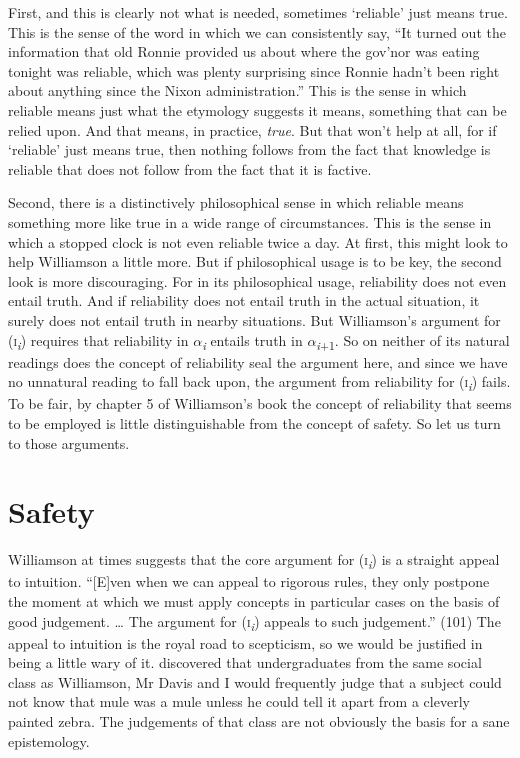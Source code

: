 First, and this is clearly not what is needed, sometimes `reliable' just means true. This is the sense of the word in which we can consistently say, ``It turned out the information that old Ronnie provided us about where the gov'nor was eating tonight was reliable, which was plenty surprising since Ronnie hadn't been right about anything since the Nixon administration.'' This is the sense in which reliable means just what the etymology suggests it means, something that can be relied upon. And that means, in practice, \textit{true}. But that won't help at all, for if `reliable' just means true, then nothing follows from the fact that knowledge is reliable that does not follow from the fact that it is factive.

Second, there is a distinctively philosophical sense in which reliable means something more like true in a wide range of circumstances. This is the sense in which a stopped clock is not even reliable twice a day. At first, this might look to help Williamson a little more. But if philosophical usage is to be key, the second look is more discouraging. For in its philosophical usage, reliability does not even entail truth. And if reliability does not entail truth in the actual situation, it surely does not entail truth in nearby situations. But Williamson's argument for (\textsc{i}\textit{\textsubscript{i}}) requires that reliability in ${\alpha}$\textit{\textsubscript{i}} entails truth in ${\alpha}$\textit{\textsubscript{i}}\textsubscript{+1}. So on neither of its natural readings does the concept of reliability seal the argument here, and since we have no unnatural reading to fall back upon, the argument from reliability for (\textsc{i}\textit{\textsubscript{i}}) fails. To be fair, by chapter 5 of Williamson's book the concept of reliability that seems to be employed is little distinguishable from the concept of safety. So let us turn to those arguments.

\section{Safety}

Williamson at times suggests that the core argument for (\textsc{i}\textit{\textsubscript{i}}) is a straight appeal to intuition. ``[E]ven when we can appeal to rigorous rules, they only postpone the moment at which we must apply concepts in particular cases on the basis of good judgement. {\dots} The argument for (\textsc{i}\textit{\textsubscript{i}}) appeals to such judgement.'' (101) The appeal to intuition is the royal road to scepticism, so we would be justified in being a little wary of it. \citet{Weinberg2001} discovered that undergraduates from the same social class as Williamson, Mr Davis and I would frequently judge that a subject could not know that mule was a mule unless he could tell it apart from a cleverly painted zebra. The judgements of that class are not obviously the basis for a sane epistemology.

